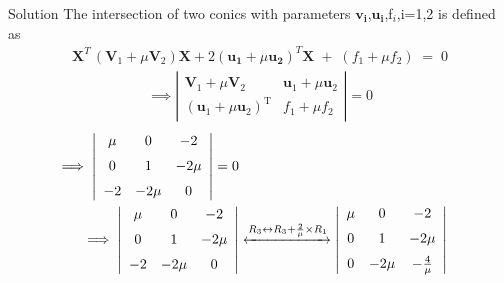 \documentclass{beamer}
\numberwithin{equation}{section}
\theoremstyle{remark}
\let\vec\mathbf
\begin{document}
\begin{frame}{Solution}
The intersection of two conics with parameters $\vec{v_i}$,$\vec{u_i}$,f$_i$,i=1,2 is defined as 
\begin{align}
\vec{X}^{T}\,(\vec{V}_{1} + \mu \vec{V}_{2})\vec{X} + 2(\vec{u_1} + \mu \vec{u_2})^{T}\vec{X} \;+\; (f_{1} + \mu f_{2}) \;=\; 0
\end{align}
\begin{align}
\implies \left|
\begin{array}{cc}
\mathbf{V}_1 + \mu \mathbf{V}_2 & \mathbf{u}_1 + \mu \mathbf{u}_2 \\[6pt]
(\mathbf{u}_1 + \mu \mathbf{u}_2)^{\mathrm{T}} & f_1 + \mu f_2
\end{array}
\right| = 0
\end{align}
\begin{align}
    \implies 
\left|
\begin{array}{ccc}
\mu & 0 & -2 \\[6pt]
0 & 1  & -2\mu \\[6pt]
-2 & -2\mu & 0
\end{array}
\right| = 0 \\
\implies \left|
\begin{array}{ccc}
\mu & 0 & -2 \\[6pt]
0 & 1  & -2\mu \\[6pt]
-2 & -2\mu & 0
\end{array}
\right| &\xleftrightarrow{R_3 \leftrightarrow R_3 + \frac{2}{\mu}\times R_1} \left|
\begin{array}{ccc}
\mu & 0 & -2 \\[6pt]
0 & 1  & -2\mu \\[6pt]
0 & -2\mu & -\frac{4}{\mu}
\end{array}
\right|
\end{align}
\end{frame}
\end{document}
